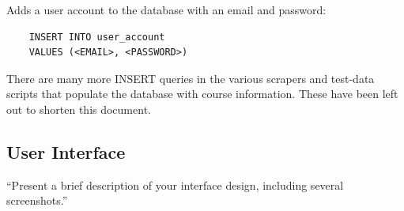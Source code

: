 \documentclass[twoside=false,a4paper,11pt]{article}
\theoremstyle{mytheor}
\begin{document}
Adds a user account to the database with an email and password:
\begin{lstlisting}
    INSERT INTO user_account
    VALUES (<EMAIL>, <PASSWORD>)
\end{lstlisting}

There are many more INSERT queries in the various scrapers and test-data scripts that populate the database with course information. These have been left out to shorten this document.

\subsection*{User Interface}

``Present a brief description of your interface design, including several screenshots.''
\end{document}
